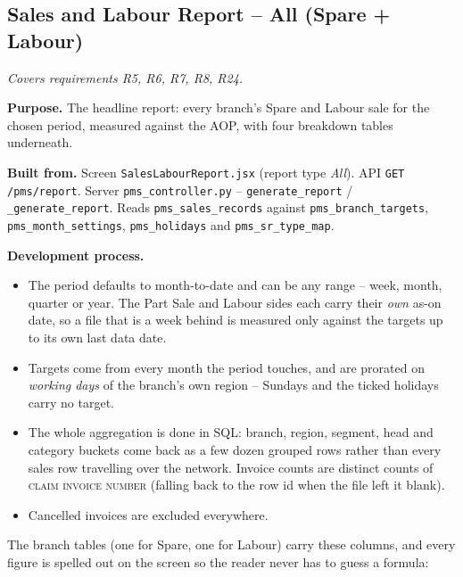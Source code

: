 \documentclass[11pt,a4paper]{article}
\newcommand{\covers}[1]{\textit{Covers requirements #1.}\par}
\newcommand{\purpose}[1]{\textbf{Purpose.} #1\par}
\newcommand{\devproc}{\textbf{Development process.}\par}
\newcommand{\builtfrom}[1]{\textbf{Built from.} #1\par}
\newcommand{\file}[1]{\texttt{\small #1}}
\newcommand{\col}[1]{\textsc{\small #1}}
\begin{document}
\subsection{Sales and Labour Report -- All (Spare + Labour)}
\covers{R5, R6, R7, R8, R24}

\purpose{The headline report: every branch's Spare and Labour sale for the chosen period,
measured against the AOP, with four breakdown tables underneath.}

\builtfrom{Screen \file{SalesLabourReport.jsx} (report type \emph{All}). API
\texttt{GET /pms/report}. Server \file{pms\_controller.py} --
\texttt{generate\_report} / \texttt{\_generate\_report}. Reads
\file{pms\_sales\_records} against \file{pms\_branch\_targets},
\file{pms\_month\_settings}, \file{pms\_holidays} and \file{pms\_sr\_type\_map}.}

\devproc
\begin{itemize}
  \item The period defaults to month-to-date and can be any range -- week, month, quarter
  or year. The Part Sale and Labour sides each carry their \emph{own} as-on date, so a
  file that is a week behind is measured only against the targets up to its own last data
  date.
  \item Targets come from every month the period touches, and are prorated on
  \emph{working days} of the branch's own region -- Sundays and the ticked holidays carry
  no target.
  \item The whole aggregation is done in SQL: branch, region, segment, head and category
  buckets come back as a few dozen grouped rows rather than every sales row travelling
  over the network. Invoice counts are distinct counts of \col{claim invoice number}
  (falling back to the row id when the file left it blank).
  \item Cancelled invoices are excluded everywhere.
\end{itemize}

The branch tables (one for Spare, one for Labour) carry these columns, and every figure
is spelled out on the screen so the reader never has to guess a formula:
\end{document}

